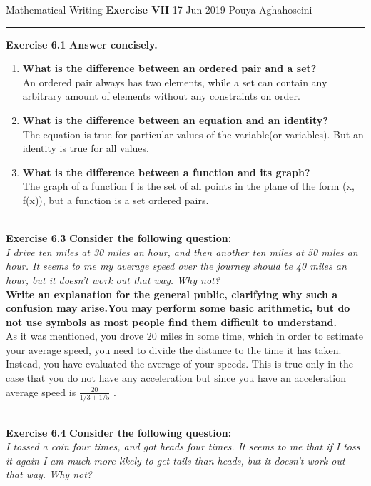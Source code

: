 \documentclass{article}
\begin{document}
	\noindent
	Mathematical Writing \hfill \textbf{Exercise VII} \newline 
	{17-Jun-2019} \hfill Pouya Aghahoseini
	
	\noindent
	\rule{\linewidth}{0.4pt}
	\textbf{\large\color{blue} Exercise 6.1}   \textbf{Answer concisely. }
	
	\begin{enumerate}
		\item 
		\textbf{What is the difference between an ordered pair and a set?}\\
		An ordered pair always has two elements, while a set can contain any arbitrary amount of elements without any constraints on order.
		\item 
		\textbf{What is the difference between an equation and an identity?}\\
		The equation is true for particular values of the variable(or variables). But an identity is true for all values. 		
		\item 
		\textbf{What is the difference between a function and its graph?}\\
		The graph of a function f is the set of all points in the plane of the form (x, f(x)), but a function is a set ordered pairs.
	\end{enumerate}
	
	\text{}\\
	\textbf{\large\color{blue} Exercise 6.3} \textbf{Consider the following question:}\\
	\textit{I drive ten miles at 30 miles an hour, and then another ten
		miles at 50 miles an hour. It seems to me my average speed
		over the journey should be 40 miles an hour, but it doesn't
		work out that way. Why not?}\\
	
	\textbf{Write an explanation for the general public, clarifying why
		such a confusion may arise.You may perform some basic
		arithmetic, but do not use symbols as most people find them
		difficult to understand.}\\
	
		As it was mentioned, you drove 20 miles in some time, which in order to estimate your average speed, you need to divide the distance to the time it has taken. Instead, you have evaluated the average of your speeds.
This is true only in the case that you do not have any acceleration but since you have an acceleration average speed is $\frac{20}{1/3+1/5}$ .

	
	
	\text{}\\
	\textbf{\large\color{blue} Exercise 6.4} \textbf{Consider the following question:}\\
	\textit{I tossed a coin four times, and got heads four times.
		It seems to me that if I toss it again I am much
		more likely to get tails than heads, but it doesn't
		work out that way. Why not?}\\
	
\end{document}
